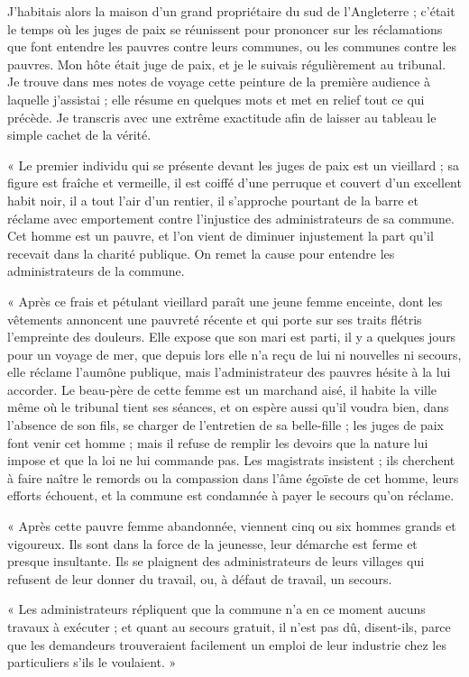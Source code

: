 \documentclass[french,twoside]{book} %
\newenvironment{quoteblock}%
  {\begin{quoting}}
  {\end{quoting}}
\newenvironment{quotebar}{%
    \def\FrameCommand{{\color{rubric!10!}\vrule width 0.5em} \hspace{0.9em}}%
    \def\OuterFrameSep{\itemsep} %
    \MakeFramed {\advance\hsize-\width \FrameRestore}
  }%
  {%
    \endMakeFramed
  }
\renewenvironment{quoteblock}%
  {%
    \savenotes
    \setstretch{0.9}
    \begin{quotebar}
  }
  {%
    \end{quotebar}
    \spewnotes
  }
\begin{document}
J'habitais alors la maison d’un grand propriétaire du sud de l’Angleterre ; c’était le temps où les juges de paix se réunissent pour prononcer sur les réclamations que font entendre les pauvres contre leurs communes, ou les communes contre les pauvres. Mon hôte était juge de paix, et je le suivais régulièrement au tribunal. Je trouve dans mes notes de voyage cette peinture de la première audience à laquelle j’assistai ; elle résume en quelques mots et met en relief tout ce qui précède. Je transcris avec une extrême exactitude afin de laisser au tableau le simple cachet de la vérité.\par

\begin{quoteblock}
 \noindent « Le premier individu qui se présente devant les juges de paix est un vieillard ; sa figure est fraîche et vermeille, il est coiffé d’une perruque et couvert d’un excellent habit noir, il a tout l’air d’un rentier, il s’approche pourtant de la barre et réclame avec emportement contre l’injustice des administrateurs de sa commune. Cet homme est un pauvre, et l’on vient de diminuer injustement la part qu’il recevait dans la charité publique. On remet la cause pour entendre les administrateurs de la commune.\par
 « Après ce frais et pétulant vieillard paraît une jeune femme enceinte, dont les vêtements annoncent une pauvreté récente et qui porte sur ses traits flétris l’empreinte des douleurs. Elle expose que son mari est parti, il y a quelques jours pour un voyage de mer, que depuis lors elle n’a reçu de lui ni nouvelles ni secours, elle réclame l’aumône publique, mais l’administrateur des pauvres hésite à la lui accorder. Le beau-père de cette femme est un marchand aisé, il habite la ville même où le tribunal tient ses séances, et on espère aussi qu’il voudra bien, dans l’absence de son fils, se charger de l’entretien de sa belle-fille ; les juges de paix font venir cet homme ; mais il refuse de remplir les devoirs que la nature lui impose et que la loi ne lui commande pas. Les magistrats insistent ; ils cherchent à faire naître le remords ou la compassion dans l’âme égoïste de cet homme, leurs efforts échouent, et la commune est condamnée à payer le secours qu’on réclame.\par
 « Après cette pauvre femme abandonnée, viennent cinq ou six hommes grands et vigoureux. Ils sont dans la force de la jeunesse, leur démarche est ferme et presque insultante. Ils se plaignent des administrateurs de leurs villages qui refusent de leur donner du travail, ou, à défaut de travail, un secours.\par
 « Les administrateurs répliquent que la commune n’a en ce moment aucuns travaux à exécuter ; et quant au secours gratuit, il n’est pas dû, disent-ils, parce que les demandeurs trouveraient facilement un emploi de leur industrie chez les particuliers s’ils le voulaient. »
 \end{quoteblock}
\end{document}
